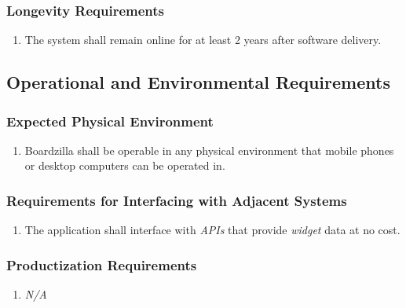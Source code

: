 \documentclass{article}
\begin{document}
\subsubsection{Longevity Requirements}
\label{ssub:longevity_requirements}
\begin{enumerate}[{PR}1. ]
	\item The system shall remain online for at least 2 years after software delivery. 
\end{enumerate}


\subsection{Operational and Environmental Requirements}
\label{sub:operational_and_environmental_requirements}

\subsubsection{Expected Physical Environment}
\label{ssub:expected_physical_environment}
\begin{enumerate}[{OE}1. ]
	\item Boardzilla shall be operable in any physical environment that mobile phones or desktop computers can be operated in.
\end{enumerate}

\subsubsection{Requirements for Interfacing with Adjacent Systems}
\label{ssub:requirements_for_interfacing_with_adjacent_systems}
\begin{enumerate}[{OE}1. ]
	\item The application shall interface with \textit{APIs} that provide \textit{widget} data at no cost.
\end{enumerate}

\subsubsection{Productization Requirements}
\label{ssub:productization_requirements}
\begin{enumerate}[{OE}1. ]
	\item \emph{N/A}
\end{enumerate}
\end{document}

